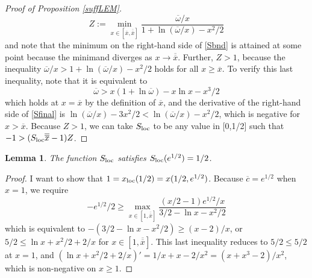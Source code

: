 \documentclass[11pt]{article}
\theoremstyle{plain}
\newtheorem{lemma}[thm]{Lemma}
\theoremstyle{definition} %
\begin{document}
\begin{proof}[Proof of Proposition \ref{suffLEM}]
\begin{equation}
Z := \min_{x \in [\overline{x}, \overline{\overline{x}}]} \frac{\overline{\omega}/x}{1 + \ln (\overline{\omega}/x) - x^2/2}
\label{Sbnd}
\end{equation}
and note that the minimum on the right-hand side of \eqref{Sbnd} is attained at some point because the minimand diverges as $x \rightarrow \overline{\overline{x}}$. Further, $Z>1$, because the inequality $\overline{\omega}/x > 1 + \ln (\overline{\omega}/x) - x^2/2$ holds for all $x \geq \overline{x}$. To verify this last inequality, note that it is equivalent to 
\begin{equation}
\overline{\omega} > x(1 + \ln \overline{\omega}) - x\ln x - x^3/2
\label{Sfinal}
\end{equation}
which holds at $x =\overline{x}$ by the definition of $\overline{x}$, and the derivative of the right-hand side of \eqref{Sfinal} is $\ln (\overline{\omega}/x) - 3x^2/2 < \ln (\overline{\omega}/x) - x^2/2$, which is negative for $x > \overline{x}$. Because $Z>1$, we can take $S_{\textnormal{loc}}$ to be any value in [0,1/2] such that $-1 > (S_{\textnormal{loc}}\overline{\overline{x}} - 1)Z$. 
\end{proof}

\begin{lemma} \label{upper}
The function $S_{\textnormal{loc}}$ satisfies $S_{\textnormal{loc}}(e^{1/2}) = 1/2$.
\end{lemma}

\begin{proof} %
I want to show that $1 = x_{\textnormal{loc}}(1/2) = x(1/2, e^{1/2})$. Because $\overline{c} = e^{1/2}$ when $x=1$, we require
$$
-e^{1/2}/2 \geq \max_{x\in [1,\overline{\overline{x}}]} \frac{(x/2-1)e^{1/2}/x}{3/2 - \ln x - x^2/2}
$$
which is equivalent to $-(3/2 - \ln x - x^2/2) \geq (x-2)/x$, or $5/2 \leq \ln x + x^2/2 + 2/x$ for $x\in [1,\overline{\overline{x}}]$. This last inequality reduces to $5/2 \leq 5/2$ at $x=1$, and $(\ln x + x^2/2 + 2/x)' = 1/x + x - 2/x^2 = (x + x^3 - 2)/x^2$, which is non-negative on $x\geq1$.
\end{proof}
\end{document}
